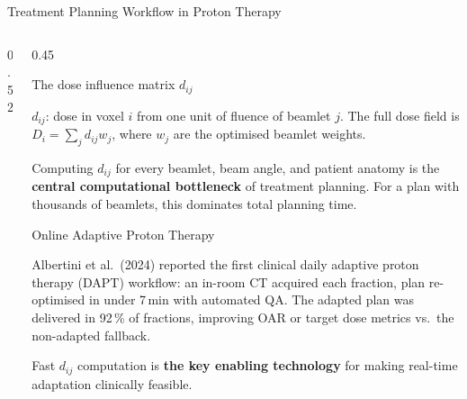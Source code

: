 \documentclass[aspectratio=169, 10pt]{beamer}
\begin{document}
\begin{frame}{Treatment Planning Workflow in Proton Therapy}
\begin{columns}[T]
\begin{column}{0.52\textwidth}
    \end{column}
    \begin{column}{0.45\textwidth}
      \begin{block}{The dose influence matrix $d_{ij}$}
        {\tiny
        $d_{ij}$: dose in voxel $i$ from one unit of fluence of beamlet $j$.
        The full dose field is $D_i = \sum_j d_{ij} w_j$,
        where $w_j$ are the optimised beamlet weights.

        \vspace{2pt}
        Computing $d_{ij}$ for every beamlet, beam angle, and patient anatomy
        is the \textbf{central computational bottleneck} of treatment planning.
        For a plan with thousands of beamlets, this dominates total planning time.}
      \end{block}

      \vspace{2pt}
      \begin{alertblock}{Online Adaptive Proton Therapy}
        {\tiny
        Albertini et al.\ (2024) reported the first clinical daily adaptive
        proton therapy (DAPT) workflow: an in-room CT acquired each fraction,
        plan re-optimised in under 7\,min with automated QA.
        The adapted plan was delivered in 92\,\% of fractions, improving
        OAR or target dose metrics vs.\ the non-adapted fallback.

        \vspace{2pt}
        Fast $d_{ij}$ computation is \textbf{the key enabling technology}
        for making real-time adaptation clinically feasible.}
      \end{alertblock}
    \end{column}
  \end{columns}
\end{frame}
\end{document}
